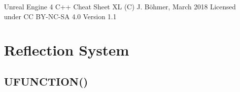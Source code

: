 \documentclass[10pt,a4paper]{article}
\begin{document}
\begin{multicols*}{2}
	
	\begin{center}
		\Huge{Unreal Engine 4 C++ Cheat Sheet XL}
		\linebreak
		\Large{(C) J. Böhmer, March 2018  \linebreak Licensed under CC BY-NC-SA 4.0}
		\linebreak
		\Large{Version 1.1}
	\end{center}
	
	\section{Reflection System}
	
	\subsection{UFUNCTION()}
	
	\begin{tabularx}{\columnwidth}{|p{4.1cm}|X|}
		

\end{tabularx}
\end{multicols*}
\end{document}
